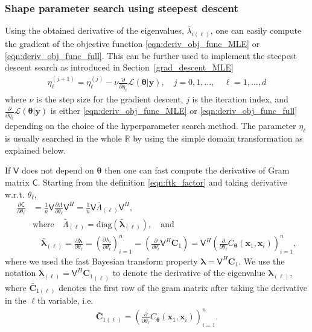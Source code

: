 \documentclass{svjour3}                     %
\newcommand{\bm}[1]{\boldsymbol{#1}}
\newcommand{\reals}{\mathbb{R}}
\newcommand{\vlambda}{{\bm{\lambda}}}
\newcommand{\vtheta}{{\bm{\theta}}}
\newcommand{\vC}{\bm{C}}
\newcommand{\vx}{\bm{x}}
\newcommand{\vy}{\bm{y}}
\newcommand{\mC}{\mathsf{C}}
\newcommand{\mLambda}{\mathsf{\Lambda}}
\newcommand{\mV}{\mathsf{V}}
\newcommand{\diag}{\text{diag}}
\newcommand\secref{Section~\ref}
\begin{document}
\subsubsection{Shape parameter search using steepest descent}
\label{sec:prod-kernel-steep-descent}
Using the obtained derivative of the eigenvalues, $\bar{\lambda}_{i(\ell)}$, one can easily compute the gradient of the objective function \eqref{eqn:deriv_obj_func_MLE} or \eqref{eqn:deriv_obj_func_full}. This can be further used to implement the steepest descent search as introduced in \secref{grad_descent_MLE} 
\begin{align*}
\eta^{(j+1)}_\ell = \eta^{(j)}_\ell - \nu \frac{\partial}{\partial \eta_\ell} \mathcal{L}(\vtheta | \vy), \quad j=0,1,\dots,  \quad \ell = 1, \dots, d
\end{align*}
where $\nu$ is the step size for the gradient descent, $j$ is the iteration index, and $\frac{\partial}{\partial \eta_\ell} \mathcal{L}(\vtheta | \vy)$ is either \eqref{eqn:deriv_obj_func_MLE} or \eqref{eqn:deriv_obj_func_full} depending on the choice of the hyperparameter search method. The parameter $\eta_\ell$ is usually searched in the whole $\reals$ by using the simple domain transformation as explained below. %


If $\mV$ does not depend on $\vtheta$ then one can fast compute the derivative of Gram matrix $\mC$. Starting from the definition \eqref{eqn:ftk_factor} and taking derivative w.r.t. $\theta_\ell$, 
\begin{align}
\nonumber
\displaystyle \frac{\partial \mC}{\partial \theta_\ell} 
& = \frac 1n \mV \frac{\partial {\mLambda}}{\partial \theta_\ell} \mV^H
= \frac 1n \mV \bar{\mLambda}_{(\ell)} \mV^H,
\\
\nonumber
& \text{where} \quad \bar{\mLambda}_{(\ell)} = \diag(\bar{\vlambda}_{(\ell)}), \quad \text{and}
\\
\label{eqn:deriv_eigenval_gram_matrix}
&  \quad \bar{\vlambda}_{(\ell)} = \frac{\partial \vlambda}{\partial \theta_\ell} = \left( \frac{\partial \lambda_i}{\partial \theta_\ell} \right)_{i=1}^n 
= \left( \frac{\partial }{\partial \theta_\ell} \mV^H {\vC_1} \right)
= \mV^H \left( \frac{\partial }{\partial \theta_\ell} {C_\vtheta(\vx_1,\vx_i)} \right)_{i=1}^n,
\end{align}
where we used the fast Bayesian transform property $\vlambda 
= \mV^H \vC_1$. %
We use the notation $\bar{\vlambda}_{(\ell)} = \mV^H \bar{\vC_1}_{(\ell)}$ to denote the derivative of the eigenvalue ${\vlambda}_{(\ell)}$,  where $\bar{\vC}_{1(\ell)}$ denotes the first row of the gram matrix after taking the derivative in the $\ell$th variable, i.e.
\begin{align*}
\bar{\vC}_{1{(\ell)}} = \left(\frac{\partial }{\partial{\theta}_\ell} C_\vtheta(\vx_1,\vx_i) \right)_{i=1}^n.
\end{align*}
\end{document}
